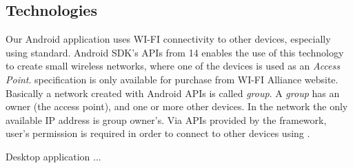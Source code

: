 \subsection{Technologies}

Our Android application uses WI-FI connectivity to other devices, especially using \direct standard. Android SDK's APIs from 14 enables the use of this technology to create small wireless networks, where one of the devices is used as an \emph{Access Point}. \direct specification is only available for purchase from WI-FI Alliance\textsuperscript{\texttrademark} website\cite{wifi_direct}.
Basically a network created with Android \direct APIs is called \emph{group}. A \emph{group} has an owner (the access point), and one or more other devices. In the network the only available IP address is group owner's. 
Via APIs provided by the framework, user's permission is required in order to connect to other devices using \direct.

Desktop application ...

